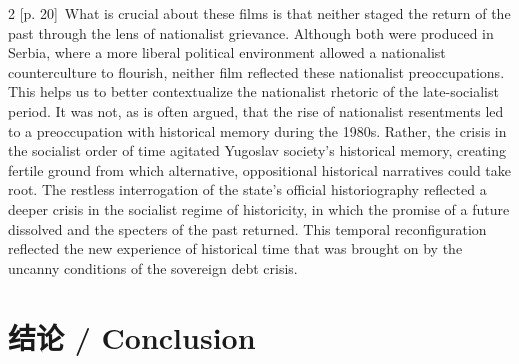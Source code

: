 \documentclass[10pt,a4paper]{article}
\begin{document}
\begin{paracol}{2}
\switchcolumn
{\scriptsize\color{gray} [p. 20]}\ What is crucial about these films is that neither staged the return of the past through the lens of nationalist grievance. Although both were produced in Serbia, where a more liberal political environment allowed a nationalist counterculture to flourish, neither film reflected these nationalist preoccupations. This helps us to better contextualize the nationalist rhetoric of the late-socialist period. It was not, as is often argued, that the rise of nationalist resentments led to a preoccupation with historical memory during the 1980s. Rather, the crisis in the socialist order of time agitated Yugoslav society’s historical memory, creating fertile ground from which alternative, oppositional historical narratives could take root. The restless interrogation of the state’s official historiography reflected a deeper crisis in the socialist regime of historicity, in which the promise of a future dissolved and the specters of the past returned. This temporal reconfiguration reflected the new experience of historical time that was brought on by the uncanny conditions of the sovereign debt crisis.\par
\switchcolumn*
\end{paracol}
\section*{结论 / Conclusion}
\end{document}
